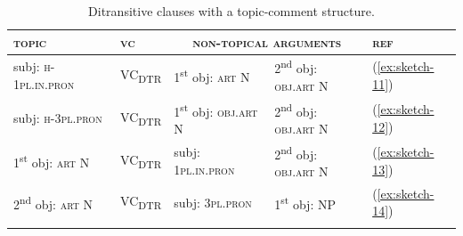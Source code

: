 \documentclass[output=paper]{langscibook}
\begin{document}
\begin{table}
        \caption{Ditransitive clauses with a topic-comment structure.} \label{tab:ditrans}
\begin{tabularx}{\textwidth}{lllll}
        \lsptoprule
        \textsc{topic}&\textsc{vc}&\multicolumn{2}{c}{\textsc{non-topical arguments}}&\textsc{ref}\\
        \midrule
        subj: \textsc{h}-1\textsc{pl}.\textsc{in}.\textsc{pron}&VC\textsubscript{DTR}&1\textsuperscript{st} obj: \textsc{art} N&2\textsuperscript{nd} obj: \textsc{obj}.\textsc{art} N&(\ref{ex:sketch-11})\\
        subj: \textsc{h}-3\textsc{pl}.\textsc{pron}&VC\textsubscript{DTR}&1\textsuperscript{st} obj: \textsc{obj}.\textsc{art} N  &2\textsuperscript{nd} obj: \textsc{obj}.\textsc{art} N&(\ref{ex:sketch-12})\\
        1\textsuperscript{st} obj: \textsc{art} N&VC\textsubscript{DTR}&subj: 1\textsc{pl}.\textsc{in}.\textsc{pron}&2\textsuperscript{nd} obj: \textsc{obj}.\textsc{art} N&(\ref{ex:sketch-13})\\
        2\textsuperscript{nd}  obj: \textsc{art} N&VC\textsubscript{DTR}&subj: 3\textsc{pl}.\textsc{pron}&1\textsuperscript{st} obj: NP&(\ref{ex:sketch-14})\\
        \lspbottomrule
\end{tabularx}
\end{table}
\end{document}
